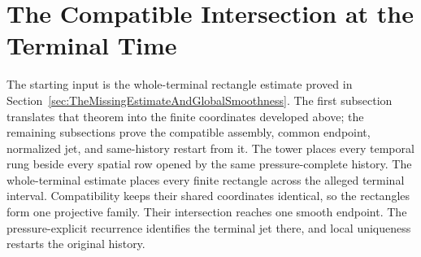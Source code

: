 
\section{The Compatible Intersection at the Terminal Time}\label{sec:TheCompatibleIntersectionAtTheTerminalTime}

The starting input is the whole-terminal rectangle estimate proved in Section~\ref{sec:TheMissingEstimateAndGlobalSmoothness}.
The first subsection translates that theorem into the finite coordinates developed above; the remaining subsections prove the compatible assembly, common endpoint, normalized jet, and same-history restart from it.
The tower places every temporal rung beside every spatial row opened by the same pressure-complete history.
The whole-terminal estimate places every finite rectangle across the alleged terminal interval.
Compatibility keeps their shared coordinates identical, so the rectangles form one projective family.
Their intersection reaches one smooth endpoint.
The pressure-explicit recurrence identifies the terminal jet there, and local uniqueness restarts the original history.






